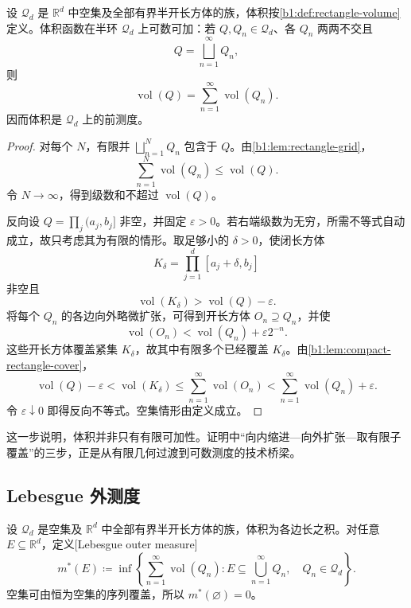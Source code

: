 \begin{theorem}
\label{b1:thm:rectangle-premeasure}
设 \(\mathscr Q_d\) 是 \(\mathbb R^d\) 中空集及全部有界半开长方体的族，体积按\cref{b1:def:rectangle-volume}定义。体积函数在半环 \(\mathscr Q_d\) 上可数可加：若 \(Q,Q_n\in\mathscr Q_d\)、各 \(Q_n\) 两两不交且
\[
Q=\bigsqcup_{n=1}^{\infty}Q_n,
\]
则
\[
\operatorname{vol}(Q)=\sum_{n=1}^{\infty}\operatorname{vol}(Q_n).
\]
因而体积是 \(\mathscr Q_d\) 上的前测度。
\end{theorem}
\begin{proof}
对每个 \(N\)，有限并 \(\bigsqcup_{n=1}^{N}Q_n\) 包含于 \(Q\)。由\cref{b1:lem:rectangle-grid}，
\[
\sum_{n=1}^{N}\operatorname{vol}(Q_n)\leq\operatorname{vol}(Q).
\]
令 \(N\to\infty\)，得到级数和不超过 \(\operatorname{vol}(Q)\)。

反向设 \(Q=\prod_j(a_j,b_j]\) 非空，并固定 \(\varepsilon>0\)。若右端级数为无穷，所需不等式自动成立，故只考虑其为有限的情形。取足够小的 \(\delta>0\)，使闭长方体
\[
K_\delta=\prod_{j=1}^{d}[a_j+\delta,b_j]
\]
非空且
\[
\operatorname{vol}(K_\delta)>\operatorname{vol}(Q)-\varepsilon.
\]
将每个 \(Q_n\) 的各边向外略微扩张，可得到开长方体 \(O_n\supseteq Q_n\)，并使
\[
\operatorname{vol}(O_n)
<\operatorname{vol}(Q_n)+\varepsilon2^{-n}.
\]
这些开长方体覆盖紧集 \(K_\delta\)，故其中有限多个已经覆盖 \(K_\delta\)。由\cref{b1:lem:compact-rectangle-cover}，
\[
\operatorname{vol}(Q)-\varepsilon
<\operatorname{vol}(K_\delta)
\leq\sum_{n=1}^{\infty}\operatorname{vol}(O_n)
<\sum_{n=1}^{\infty}\operatorname{vol}(Q_n)+\varepsilon.
\]
令 \(\varepsilon\downarrow0\) 即得反向不等式。空集情形由定义成立。
\end{proof}

这一步说明，体积并非只有有限可加性。证明中“向内缩进—向外扩张—取有限子覆盖”的三步，正是从有限几何过渡到可数测度的技术桥梁。

\subsection{Lebesgue 外测度}
\label{b1:subsec:030102}

\begin{definition}
\label{b1:def:lebesgue-outer-measure}
设 \(\mathscr Q_d\) 是空集及 \(\mathbb R^d\) 中全部有界半开长方体的族，体积为各边长之积。对任意 \(E\subseteq\mathbb R^d\)，定义[Lebesgue outer measure]
\[
 m^*(E)
 \coloneqq\inf\left\{
\sum_{n=1}^{\infty}\operatorname{vol}(Q_n):
E\subseteq\bigcup_{n=1}^{\infty}Q_n,\quad
Q_n\in\mathscr Q_d
\right\}.
\]
空集可由恒为空集的序列覆盖，所以 \(m^*(\varnothing)=0\)。
\end{definition}

